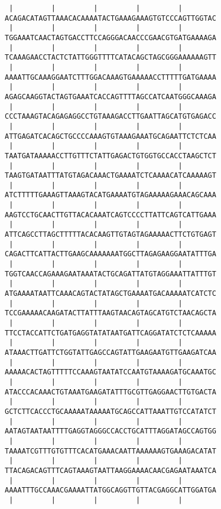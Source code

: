 \documentclass{article}
\begin{document}
\begin{Verbatim}
 |         |         |         |         |        
ACAGACATAGTTAAACACAAAATACTGAAAGAAAGTGTCCCAGTTGGTAC
 |         |         |         |         |        
TGGAAATCAACTAGTGACCTTCCAGGGACAACCCGAACGTGATGAAAAGA
 |         |         |         |         |        
TCAAAGAACCTACTCTATTGGGTTTTCATACAGCTAGCGGGAAAAAAGTT
 |         |         |         |         |        
AAAATTGCAAAGGAATCTTTGGACAAAGTGAAAAACCTTTTTGATGAAAA
 |         |         |         |         |        
AGAGCAAGGTACTAGTGAAATCACCAGTTTTAGCCATCAATGGGCAAAGA
 |         |         |         |         |        
CCCTAAAGTACAGAGAGGCCTGTAAAGACCTTGAATTAGCATGTGAGACC
 |         |         |         |         |        
ATTGAGATCACAGCTGCCCCAAAGTGTAAAGAAATGCAGAATTCTCTCAA
 |         |         |         |         |        
TAATGATAAAAACCTTGTTTCTATTGAGACTGTGGTGCCACCTAAGCTCT
 |         |         |         |         |        
TAAGTGATAATTTATGTAGACAAACTGAAAATCTCAAAACATCAAAAAGT
 |         |         |         |         |        
ATCTTTTTGAAAGTTAAAGTACATGAAAATGTAGAAAAAGAAACAGCAAA
 |         |         |         |         |        
AAGTCCTGCAACTTGTTACACAAATCAGTCCCCTTATTCAGTCATTGAAA
 |         |         |         |         |        
ATTCAGCCTTAGCTTTTTACACAAGTTGTAGTAGAAAAACTTCTGTGAGT
 |         |         |         |         |        
CAGACTTCATTACTTGAAGCAAAAAAATGGCTTAGAGAAGGAATATTTGA
 |         |         |         |         |        
TGGTCAACCAGAAAGAATAAATACTGCAGATTATGTAGGAAATTATTTGT
 |         |         |         |         |        
ATGAAAATAATTCAAACAGTACTATAGCTGAAAATGACAAAAATCATCTC
 |         |         |         |         |        
TCCGAAAAACAAGATACTTATTTAAGTAACAGTAGCATGTCTAACAGCTA
 |         |         |         |         |        
TTCCTACCATTCTGATGAGGTATATAATGATTCAGGATATCTCTCAAAAA
 |         |         |         |         |        
ATAAACTTGATTCTGGTATTGAGCCAGTATTGAAGAATGTTGAAGATCAA
 |         |         |         |         |        
AAAAACACTAGTTTTTCCAAAGTAATATCCAATGTAAAAGATGCAAATGC
 |         |         |         |         |        
ATACCCACAAACTGTAAATGAAGATATTTGCGTTGAGGAACTTGTGACTA
 |         |         |         |         |        
GCTCTTCACCCTGCAAAAATAAAAATGCAGCCATTAAATTGTCCATATCT
 |         |         |         |         |        
AATAGTAATAATTTTGAGGTAGGGCCACCTGCATTTAGGATAGCCAGTGG
 |         |         |         |         |        
TAAAATCGTTTGTGTTTCACATGAAACAATTAAAAAAGTGAAAGACATAT
 |         |         |         |         |        
TTACAGACAGTTTCAGTAAAGTAATTAAGGAAAACAACGAGAATAAATCA
 |         |         |         |         |        
AAAATTTGCCAAACGAAAATTATGGCAGGTTGTTACGAGGCATTGGATGA
 |         |         |         |         |        

\end{Verbatim}
\end{document}
